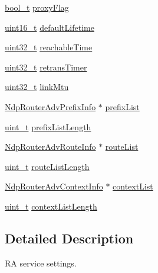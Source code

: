 \begin{DoxyCompactItemize}
\hyperlink{compiler__port_8h_a812d16e5494522586b3784e55d479912}{bool\+\_\+t} \hyperlink{structNdpRouterAdvSettings_a282463d8148222815a4e68ea2328de09}{proxy\+Flag}
\item 
\hyperlink{stdint_8h_a273cf69d639a59973b6019625df33e30}{uint16\+\_\+t} \hyperlink{structNdpRouterAdvSettings_af9440a66b7fc353fe3e1bfd7da807f04}{default\+Lifetime}
\item 
\hyperlink{stdint_8h_a435d1572bf3f880d55459d9805097f62}{uint32\+\_\+t} \hyperlink{structNdpRouterAdvSettings_aa41a6dac5e9a347436e5ddad63ddb465}{reachable\+Time}
\item 
\hyperlink{stdint_8h_a435d1572bf3f880d55459d9805097f62}{uint32\+\_\+t} \hyperlink{structNdpRouterAdvSettings_a01938dfb7fd3120b30d1eaeb2cf08fe9}{retrans\+Timer}
\item 
\hyperlink{stdint_8h_a435d1572bf3f880d55459d9805097f62}{uint32\+\_\+t} \hyperlink{structNdpRouterAdvSettings_a5d6a42b54dd4ea6dcdd19a4cea463b4d}{link\+Mtu}
\item 
\hyperlink{structNdpRouterAdvPrefixInfo}{Ndp\+Router\+Adv\+Prefix\+Info} $\ast$ \hyperlink{structNdpRouterAdvSettings_a1c030cc97653fd960d2b2e7d9cea1686}{prefix\+List}
\item 
\hyperlink{compiler__port_8h_a12a1e9b3ce141648783a82445d02b58d}{uint\+\_\+t} \hyperlink{structNdpRouterAdvSettings_a92cd68cc2a6d00d163975883d96e4b8a}{prefix\+List\+Length}
\item 
\hyperlink{structNdpRouterAdvRouteInfo}{Ndp\+Router\+Adv\+Route\+Info} $\ast$ \hyperlink{structNdpRouterAdvSettings_a417bf2852d471feb460689260e7c0947}{route\+List}
\item 
\hyperlink{compiler__port_8h_a12a1e9b3ce141648783a82445d02b58d}{uint\+\_\+t} \hyperlink{structNdpRouterAdvSettings_abdaa4e2480f0ba5dadb7e7b00784aab5}{route\+List\+Length}
\item 
\hyperlink{structNdpRouterAdvContextInfo}{Ndp\+Router\+Adv\+Context\+Info} $\ast$ \hyperlink{structNdpRouterAdvSettings_ae96fbd40e70dc52651cf9e6462cbf121}{context\+List}
\item 
\hyperlink{compiler__port_8h_a12a1e9b3ce141648783a82445d02b58d}{uint\+\_\+t} \hyperlink{structNdpRouterAdvSettings_ac4a679b32c25d5bc6d35b88f99cd0dcb}{context\+List\+Length}
\end{DoxyCompactItemize}


\subsection{Detailed Description}
RA service settings. 

